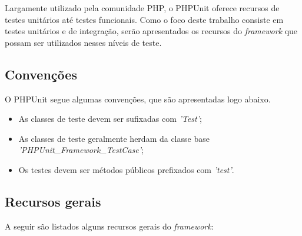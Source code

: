   Largamente utilizado pela comunidade PHP, o PHPUnit oferece recursos de testes unitários até
  testes funcionais. Como o foco deste trabalho consiste em testes unitários e de integração, serão
  apresentados os recursos do \textit{framework} que possam ser utilizados nesses níveis de teste.
  
  \subsection{Convenções}
    
    O PHPUnit segue algumas convenções, que são apresentadas logo abaixo.
    
    \begin{itemize}
      \item As classes de teste devem ser sufixadas com \textit{'Test'};
      
      \item As classes de teste geralmente herdam da classe base \textit{'PHPUnit\_Framework\_TestCase'};
      
      \item Os testes devem ser métodos públicos prefixados com \textit{'test'}.
    \end{itemize}

  
  \subsection{Recursos gerais}
  
    A seguir são listados alguns recursos gerais do \textit{framework}:
    
